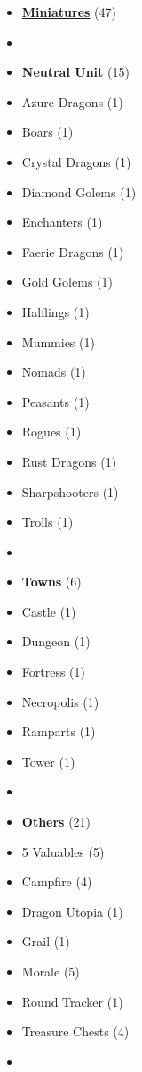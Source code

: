 
\begin{multicols*}{2}

\footnotesize

\begin{itemize}[leftmargin=0pt, label={}, noitemsep, noitemsep]
  \item \textbf{\small{\underline{Miniatures}}} (47)
  \item
  \item \textbf{Neutral Unit} (15)
  \item Azure Dragons (1)
  \item Boars (1)
  \item Crystal Dragons (1)
  \item Diamond Golems (1)
  \item Enchanters (1)
  \item Faerie Dragons (1)
  \item Gold Golems (1)
  \item Halflings (1)
  \item Mummies (1)
  \item Nomads (1)
  \item Peasants (1)
  \item Rogues (1)
  \item Rust Dragons (1)
  \item Sharpshooters (1)
  \item Trolls (1)
  \item
  \item \textbf{Towns} (6)
  \item Castle (1)
  \item Dungeon (1)
  \item Fortress (1)
  \item Necropolis (1)
  \item Ramparts (1)
  \item Tower (1)
  \item
  \item \textbf{Others} (21)
  \item 5 Valuables (5)
  \item Campfire (4)
  \item Dragon Utopia (1)
  \item Grail (1)
  \item Morale (5)
  \item Round Tracker (1)
  \item Treasure Chests (4)
  \item

\end{itemize}
\end{multicols*}
